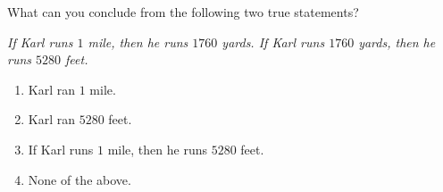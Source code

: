 What can you conclude from the following two true statements?

\emph{If Karl runs $1$ mile, then he runs $1760$ yards. If Karl runs $1760$ yards, then he runs $5280$ feet.}
\begin{enumerate}
\item[(A)] Karl ran $1$ mile.
\item[(B)] Karl ran $5280$ feet.
\item[(C)] If Karl runs $1$ mile, then he runs $5280$ feet.
\item[(D)] None of the above.
\end{enumerate}
